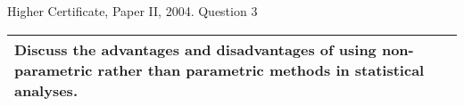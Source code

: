 \documentclass[a4paper,12pt]{article}
\begin{document}
Higher Certificate, Paper II, 2004. Question 3


\begin{table}[ht!]
 
\centering
 
\begin{tabular}{|p{15cm}|}
 
\hline  

Discuss the advantages and disadvantages of using non-parametric rather than parametric methods in statistical analyses.
 
  

\\ \hline
  
\end{tabular}

\end{table}
\end{document}

